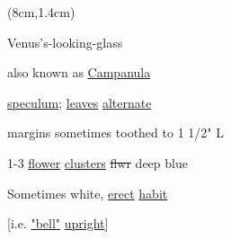 \documentclass[a4paper]{article}
\begin{document}
\begin{textblock*}{6cm}(8cm,1.4cm)%
	\begin{minipage}{6cm} 
        \color{blue}
		Venus's-looking-glass\par
        also known as \ul{Campanula}\par
        \ul{speculum}; 
        \setul{}{2pt}
        \ul{leaves} \ul{alternate}\par
        margins sometimes toothed to 1 1/2" L \par
        1-3 \ul{flower} \ul{clusters} \sout{flwr} deep blue\par
        Sometimes white, \ul{erect} \ul{habit}\par
        {[i.e. \ul{"bell"} \ul{upright}]}\par		
	\end{minipage}%
\end{textblock*}%
\end{document}
